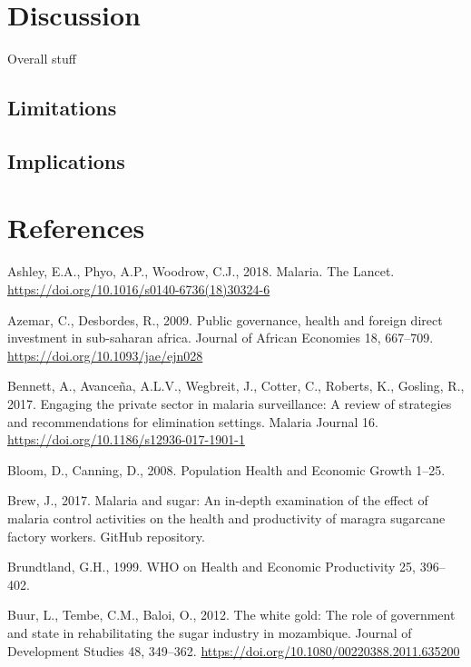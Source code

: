 \documentclass[]{article}
\begin{document}
\section{Discussion}\label{discussion}

Overall stuff

\subsection{Limitations}\label{limitations}

\subsection{Implications}\label{implications}

\section*{References}\label{references}

\hypertarget{refs}{}
\hypertarget{ref-Ashley2018}{}
Ashley, E.A., Phyo, A.P., Woodrow, C.J., 2018. Malaria. The Lancet.
\url{https://doi.org/10.1016/s0140-6736(18)30324-6}

\hypertarget{ref-Azemar2009}{}
Azemar, C., Desbordes, R., 2009. Public governance, health and foreign
direct investment in sub-saharan africa. Journal of African Economies
18, 667--709. \url{https://doi.org/10.1093/jae/ejn028}

\hypertarget{ref-Bennett_2017}{}
Bennett, A., Avanceña, A.L.V., Wegbreit, J., Cotter, C., Roberts, K.,
Gosling, R., 2017. Engaging the private sector in malaria surveillance:
A review of strategies and recommendations for elimination settings.
Malaria Journal 16. \url{https://doi.org/10.1186/s12936-017-1901-1}

\hypertarget{ref-Bloom2008}{}
Bloom, D., Canning, D., 2008. Population Health and Economic Growth
1--25.

\hypertarget{ref-brewgit}{}
Brew, J., 2017. Malaria and sugar: An in-depth examination of the effect
of malaria control activities on the health and productivity of maragra
sugarcane factory workers. GitHub repository.

\hypertarget{ref-World1999}{}
Brundtland, G.H., 1999. WHO on Health and Economic Productivity 25,
396--402.

\hypertarget{ref-Buur2012}{}
Buur, L., Tembe, C.M., Baloi, O., 2012. The white gold: The role of
government and state in rehabilitating the sugar industry in mozambique.
Journal of Development Studies 48, 349--362.
\url{https://doi.org/10.1080/00220388.2011.635200}
\end{document}
